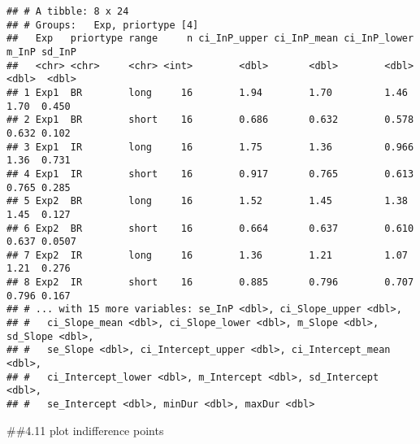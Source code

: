 \documentclass[
]{article}
\begin{document}
\begin{verbatim}
## # A tibble: 8 x 24
## # Groups:   Exp, priortype [4]
##   Exp   priortype range     n ci_InP_upper ci_InP_mean ci_InP_lower m_InP sd_InP
##   <chr> <chr>     <chr> <int>        <dbl>       <dbl>        <dbl> <dbl>  <dbl>
## 1 Exp1  BR        long     16        1.94        1.70         1.46  1.70  0.450 
## 2 Exp1  BR        short    16        0.686       0.632        0.578 0.632 0.102 
## 3 Exp1  IR        long     16        1.75        1.36         0.966 1.36  0.731 
## 4 Exp1  IR        short    16        0.917       0.765        0.613 0.765 0.285 
## 5 Exp2  BR        long     16        1.52        1.45         1.38  1.45  0.127 
## 6 Exp2  BR        short    16        0.664       0.637        0.610 0.637 0.0507
## 7 Exp2  IR        long     16        1.36        1.21         1.07  1.21  0.276 
## 8 Exp2  IR        short    16        0.885       0.796        0.707 0.796 0.167 
## # ... with 15 more variables: se_InP <dbl>, ci_Slope_upper <dbl>,
## #   ci_Slope_mean <dbl>, ci_Slope_lower <dbl>, m_Slope <dbl>, sd_Slope <dbl>,
## #   se_Slope <dbl>, ci_Intercept_upper <dbl>, ci_Intercept_mean <dbl>,
## #   ci_Intercept_lower <dbl>, m_Intercept <dbl>, sd_Intercept <dbl>,
## #   se_Intercept <dbl>, minDur <dbl>, maxDur <dbl>
\end{verbatim}

\#\#4.11 plot indifference points
\end{document}

